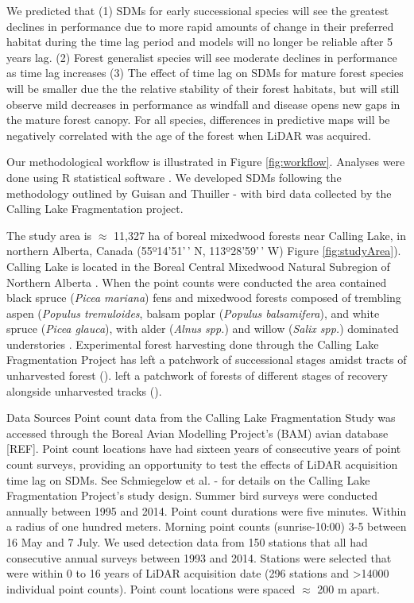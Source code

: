 \documentclass[remotesensing, aricle,submit,moreauthors]{Definitions/mdpi}
\begin{document}
We predicted that (1) SDMs for early successional species will see the greatest declines in performance due to more rapid amounts of change in their preferred habitat during the time lag period and models will no longer be reliable after 5 years lag. (2) Forest generalist species will see moderate declines in performance as time lag increases (3) The effect of time lag on SDMs for mature forest species will be smaller due the the relative stability of their forest habitats, but will still observe mild decreases in performance as windfall and disease opens new gaps in the mature forest canopy. For all species, differences in predictive maps will be negatively correlated with the age of the forest when LiDAR was acquired.

Our methodological workflow is illustrated in Figure \ref{fig:workflow}. Analyses were done using R statistical software \citep{R-base}. We developed SDMs following the methodology outlined by Guisan and Thuiller -\citet{Guisan2005} with bird data collected by the Calling Lake Fragmentation project.

The study area is \(\approx\) 11,327 ha of boreal mixedwood forests near Calling Lake, in northern Alberta, Canada (55º14'51'\,' N, 113º28'59'\,' W) Figure \ref{fig:studyArea}). Calling Lake is located in the Boreal Central Mixedwood Natural Subregion of Northern Alberta \citep{Downing2006}. When the point counts were conducted the area contained black spruce (\emph{Picea mariana}) fens and mixedwood forests composed of trembling aspen (\emph{Populus tremuloides}, balsam poplar (\emph{Populus balsamifera}), and white spruce (\emph{Picea glauca}), with alder (\emph{Alnus spp.}) and willow (\emph{Salix spp.}) dominated understories \citep{Schmiegelow1997}. Experimental forest harvesting done through the Calling Lake Fragmentation Project has left a patchwork of successional stages amidst tracts of unharvested forest (\citet{Schmiegelow1997}). left a patchwork of forests of different stages of recovery alongside unharvested tracks (\citet{Schmiegelow1997}).

Data Sources
Point count data from the Calling Lake Fragmentation Study was accessed through the Boreal Avian Modelling Project's (BAM) avian database {[}REF{]}. Point count locations have had sixteen years of consecutive years of point count surveys, providing an opportunity to test the effects of LiDAR acquisition time lag on SDMs. See Schmiegelow et al. -\citet{Schmiegelow1997} for details on the Calling Lake Fragmentation Project's study design. Summer bird surveys were conducted annually between 1995 and 2014. Point count durations were five minutes. Within a radius of one hundred meters. Morning point counts (sunrise-10:00) 3-5 between 16 May and 7 July. We used detection data from 150 stations that all had consecutive annual surveys between 1993 and 2014. Stations were selected that were within 0 to 16 years of LiDAR acquisition date (296 stations and \textgreater14000 individual point counts). Point count locations were spaced \(\approx\) 200 m apart.
\end{document}
